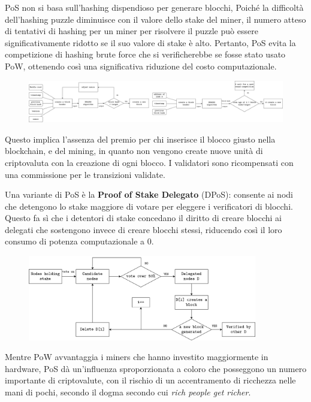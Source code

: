 PoS non si basa sull'hashing dispendioso per generare blocchi, Poiché la difficoltà dell'hashing puzzle diminuisce con il valore dello stake del miner, il numero atteso di tentativi di hashing per un miner per risolvere il puzzle può essere significativamente ridotto se il suo valore di stake è alto. Pertanto, PoS evita la competizione di hashing brute force che si verificherebbe se fosse stato usato PoW, ottenendo così una significativa riduzione del costo computazionale.

\begin{figure}[htb!]
    \centering
    \includegraphics[width=15cm]{./Images/cap3/3.11.png}
\end{figure}

Questo implica l'assenza del premio per chi inserisce il blocco giusto nella blockchain, e del mining, in quanto non vengono create nuove unità di criptovaluta con la creazione di ogni blocco. I validatori sono ricompensati con una commissione per le transizioni validate. 

Una variante di PoS è la \textbf{Proof of Stake Delegato} (DPoS): consente ai nodi che detengono lo stake maggiore di votare per eleggere i verificatori di blocchi. Questo fa sì che i detentori di stake concedano il diritto di creare blocchi ai delegati che sostengono invece di creare blocchi stessi, riducendo così il loro consumo di potenza computazionale a 0.

\begin{figure}[htb!]
    \centering
    \includegraphics[width=10cm]{./Images/cap3/3.12.png}
\end{figure}

Mentre PoW avvantaggia i miners che hanno investito maggiormente in hardware, PoS dà un'influenza sproporzionata a coloro che posseggono un numero importante di criptovalute, con il rischio di un accentramento di ricchezza nelle mani di pochi, secondo il dogma secondo cui \textit{rich people get richer}.

